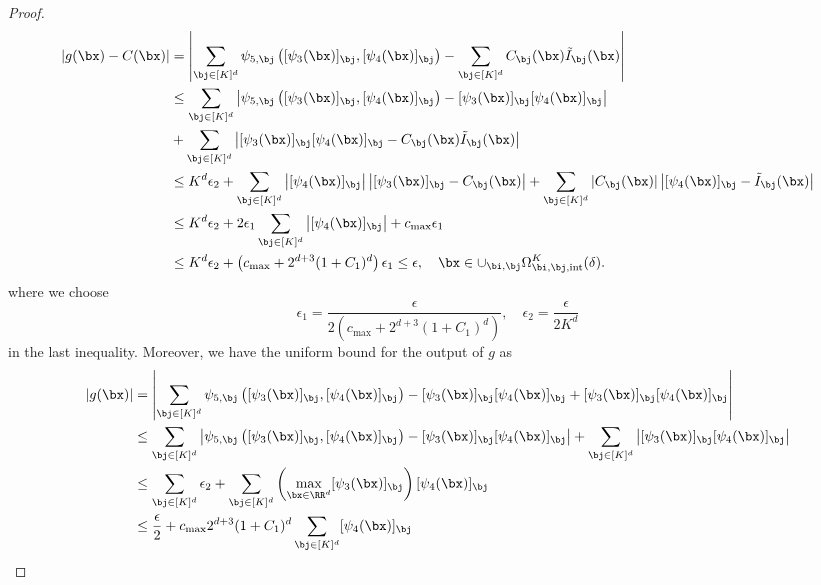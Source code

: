 \documentclass[11pt]{article}
\begin{document}
\begin{proof}
\begin{equation*}
\begin{aligned}
            \left| g(\bx) - C(\bx)\right| &  = \left| \sum_{\bj \in [K]^d} \psi_{5, \bj} \left([\psi_3(\bx)]_{\bj}, [\psi_4(\bx)]_{\bj}\right) - \sum_{\bj \in [K]^d} C_{\bj}(\bx) \tilde{I}_{\bj}(\bx) \right| \\
            & \leq \sum_{\bj \in [K]^d} \left| \psi_{5, \bj} \left([\psi_3(\bx)]_{\bj}, [\psi_4(\bx)]_{\bj}\right) - [\psi_3(\bx)]_{\bj} [\psi_4(\bx)]_{\bj}\right| \\
            &+ \sum_{\bj \in [K]^d} \left|[\psi_3(\bx)]_{\bj} [\psi_4(\bx)]_{\bj} - C_{\bj}(\bx) \tilde{I}_{\bj}(\bx) \right| \\
            &\leq K^d \epsilon_2 + \sum_{\bj \in [K]^d} \left| [\psi_4(\bx)]_{\bj}\right| \left| [\psi_3(\bx)]_{\bj} - C_{\bj}(\bx)\right|  + \sum_{\bj \in [K]^d} |C_{\bj}(\bx)| \left| [\psi_4(\bx)]_{\bj} - \tilde{I}_{\bj}(\bx)\right| \\
            & \leq K^d \epsilon_2 + 2 \epsilon_1 \sum_{\bj \in [K]^d} \left| [\psi_4(\bx)]_{\bj}\right| + c_{\max} \epsilon_1 \\
            & \leq K^d \epsilon_2 + \left(c_{\max} + 2^{d+3}(1 + C_1)^d \right) \epsilon_1 \leq \epsilon, \quad \bx \in \cup_{\bi, \bj} \Omega_{\bi, \bj, \mathrm{int}}^{K}(\delta). 
        \end{aligned}
    \end{equation*}
    where we choose 
    \begin{equation*}
        \epsilon_1 = \frac{\epsilon}{2 \left(c_{\max} + 2^{d+3}(1 + C_1)^d \right)}, \quad \epsilon_2 = \frac{\epsilon}{2 K^d}
    \end{equation*}
    in the last inequality. Moreover, we have the uniform bound for the output of $g$ as 
    \begin{equation*}
        \begin{aligned}
            |g(\bx)| &= \left|\sum_{\bj \in [K]^d}  \psi_{5, \bj} \left([\psi_3(\bx)]_{\bj}, [\psi_4(\bx)]_{\bj}\right) - [\psi_3(\bx)]_{\bj} [\psi_4(\bx)]_{\bj} +  [\psi_3(\bx)]_{\bj} [\psi_4(\bx)]_{\bj}\right| \\
            & \leq \sum_{\bj \in [K]^d} \left| \psi_{5, \bj} \left([\psi_3(\bx)]_{\bj}, [\psi_4(\bx)]_{\bj}\right) - [\psi_3(\bx)]_{\bj} [\psi_4(\bx)]_{\bj}\right| + \sum_{\bj \in [K]^d} \left|  [\psi_3(\bx)]_{\bj} [\psi_4(\bx)]_{\bj}\right| \\
            & \leq \sum_{\bj \in [K]^d} \epsilon_2 + \sum_{\bj \in [K]^d } \left( \max_{\bx \in \RR^d} [\psi_3(\bx)]_{\bj}\right)  [\psi_4(\bx)]_{\bj} \\
            &  \leq \frac{\epsilon}{2} + c_{\max} 2^{d+3} (1+C_1)^d \sum_{\bj \in [K]^d } [\psi_4(\bx)]_{\bj} \\

\end{aligned}
\end{equation*}
\end{proof}
\end{document}
